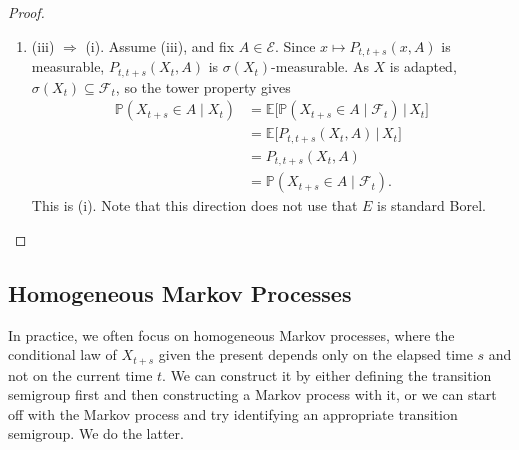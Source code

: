 \begin{proof}
\begin{enumerate}
			\item (iii) $\Rightarrow$ (i). Assume (iii), and fix $A \in \mathcal{E}$. Since $x \mapsto P_{t,t+s}(x, A)$ is measurable, $P_{t,t+s}(X_t, A)$ is $\sigma(X_t)$-measurable. As $X$ is adapted, $\sigma(X_t) \subseteq \mathcal{F}_t$, so the tower property gives
				\begin{align}
					\mathbb{P}(X_{t+s} \in A \mid X_t) & = \mathbb{E}\big[\mathbb{P}(X_{t+s} \in A \mid \mathcal{F}_t) \,\big|\, X_t\big] \\ 
																						 & = \mathbb{E}\big[P_{t,t+s}(X_t, A) \,\big|\, X_t\big] \\ 
																						 & = P_{t,t+s}(X_t, A) \\ 
																						 & = \mathbb{P}(X_{t+s} \in A \mid \mathcal{F}_t).
				\end{align}
			This is (i). Note that this direction does not use that $E$ is standard Borel.
		\end{enumerate}
	\end{proof}

\subsection{Homogeneous Markov Processes}

	In practice, we often focus on homogeneous Markov processes, where the conditional law of $X_{t+s}$ given the present depends only on the elapsed time $s$ and not on the current time $t$. We can construct it by either defining the transition semigroup first and then constructing a Markov process with it, or we can start off with the Markov process and try identifying an appropriate transition semigroup. We do the latter. 

